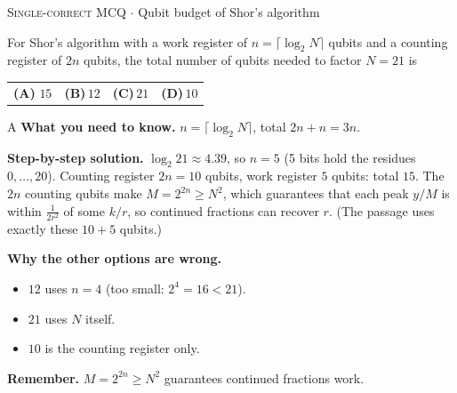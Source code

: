 \documentclass[11pt,a4paper]{article}
\newcommand{\optlabel}[1]{\textbf{(#1)}}
\newcommand{\correctlabel}[1]{\textcolor{okgreen}{\textbf{(#1)}\,\ding{51}}}
\newenvironment{qitem}[1]{\begin{list}{}{\setlength{\leftmargin}{3.3em}\setlength{\labelwidth}{3.1em}%
  \setlength{\labelsep}{0.2em}\setlength{\topsep}{3pt}\setlength{\parsep}{3pt}}\item[\textbf{Q.#1}\hfill]}{\end{list}}
\newcommand{\qsep}{\par\vspace{2pt}{\color{black!15}\hrule}\vspace{4pt}}
\newcommand{\qmeta}[2]{{\footnotesize\color{black!60}\textsc{#1} \;$\cdot$\; #2}\par}
\begin{document}
\begin{qitem}{68}
\qmeta{Single-correct MCQ}{Qubit budget of Shor's algorithm}
For Shor's algorithm with a work register of $n = \lceil\log_2 N\rceil$ qubits and a counting register of $2n$ qubits,
the total number of qubits needed to factor $N = 21$ is
\par\smallskip\noindent\begin{tabularx}{\linewidth}{@{}*{4}{L}@{}}
\correctlabel{A}\,$15$ & \optlabel{B}\,$12$ & \optlabel{C}\,$21$ & \optlabel{D}\,$10$
\end{tabularx}
\end{qitem}
\begin{solbox}{A}
\textbf{\color{brand}What you need to know.} $n = \lceil\log_2N\rceil$, total $2n + n = 3n$.

\textbf{\color{brand}Step-by-step solution.} $\log_2 21 \approx 4.39$, so $n = 5$ (5 bits hold the residues $0, \dots, 20$). Counting register $2n = 10$ qubits, work
register $5$ qubits: total $15$. The $2n$ counting qubits make $M = 2^{2n} \ge N^2$, which guarantees that each peak
$y/M$ is within $\frac{1}{2r^2}$ of some $k/r$, so continued fractions can recover $r$. (The passage uses exactly these
$10 + 5$ qubits.)

\textbf{\color{brand}Why the other options are wrong.}
\begin{itemize}[leftmargin=2.4em, itemsep=1pt, topsep=2pt]
\item[\textbf{(B)}] $12$ uses $n = 4$ (too small: $2^4 = 16 < 21$).
\item[\textbf{(C)}] $21$ uses $N$ itself.
\item[\textbf{(D)}] $10$ is the counting register only.
\end{itemize}
\textbf{\color{brand}Remember.} $M = 2^{2n} \ge N^2$ guarantees continued fractions work.
\end{solbox}
\qsep
\end{document}
